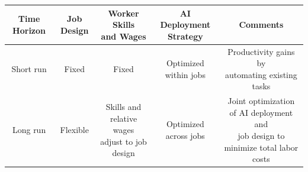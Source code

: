 \begin{tabular}{|c|c|c|c|c|}
\hline
\textbf{Time Horizon} & 
\textbf{Job Design} & 
\minitab[c]{\textbf{Worker Skills}\\\textbf{and Wages}} & 
\minitab[c]{\textbf{AI Deployment}\\\textbf{Strategy}} & 
\textbf{Comments} \\ 
\hline
Short run & 
Fixed & 
Fixed & 
Optimized within jobs & 
\minitab[c]{Productivity gains by\\automating existing tasks} \\
\hline
Long run & 
Flexible & 
\minitab[c]{Skills and relative wages\\adjust to job design} &
Optimized across jobs &
\minitab[c]{Joint optimization of AI deployment and\\job design to minimize total labor costs}\\
\hline
\end{tabular}